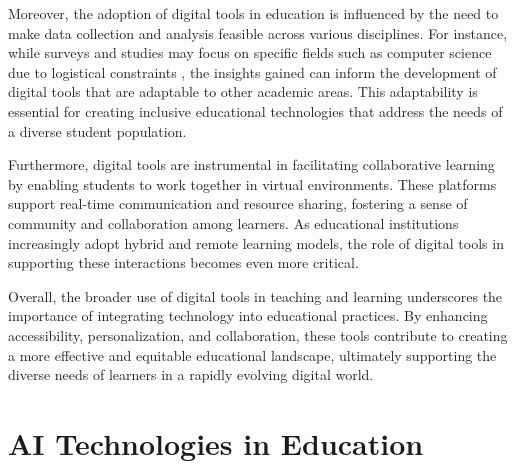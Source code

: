 Moreover, the adoption of digital tools in education is influenced by the need to make data collection and analysis feasible across various disciplines. For instance, while surveys and studies may focus on specific fields such as computer science due to logistical constraints \cite{cohen2015costreadingresearchstudy}, the insights gained can inform the development of digital tools that are adaptable to other academic areas. This adaptability is essential for creating inclusive educational technologies that address the needs of a diverse student population.



Furthermore, digital tools are instrumental in facilitating collaborative learning by enabling students to work together in virtual environments. These platforms support real-time communication and resource sharing, fostering a sense of community and collaboration among learners. As educational institutions increasingly adopt hybrid and remote learning models, the role of digital tools in supporting these interactions becomes even more critical.



Overall, the broader use of digital tools in teaching and learning underscores the importance of integrating technology into educational practices. By enhancing accessibility, personalization, and collaboration, these tools contribute to creating a more effective and equitable educational landscape, ultimately supporting the diverse needs of learners in a rapidly evolving digital world.












\section{AI Technologies in Education} \label{sec:AI Technologies in Education}



